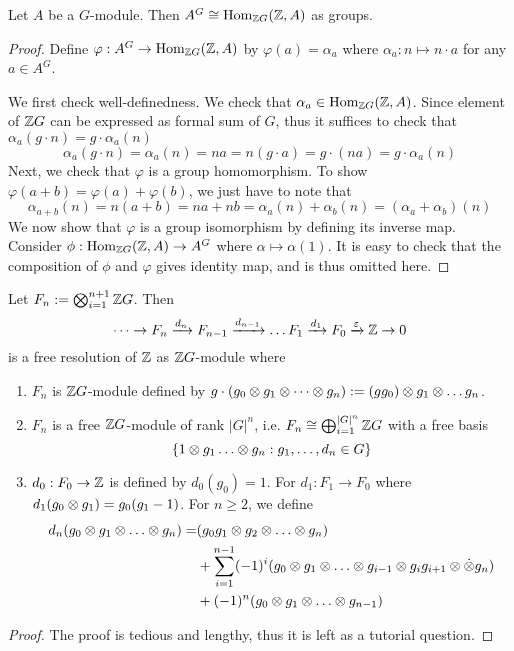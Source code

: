 \begin{lem}
    Let $A$ be a $G$-module. Then $A^G \cong \operatorname{Hom}_{{\mathbb Z} G}({\mathbb Z},A)$ as groups.
\end{lem}
\begin{proof}
    Define $\varphi: A^G \to \operatorname{Hom}_{{\mathbb Z} G}({\mathbb Z}, A)$ by $\varphi(a)= \alpha_a$ where $\alpha_a: n \mapsto n\cdot a$ for any $a\in A^G$.

    We first check well-definedness. We check that $\alpha_a \in \operatorname{Hom}_{{\mathbb Z} G}({\mathbb Z},A)$. Since element of ${\mathbb Z} G$ can be expressed as formal sum of $G$, thus it suffices to check that $\alpha_a(g\cdot n) = g\cdot \alpha_a(n)$ 
    \[\alpha_a(g\cdot n) = \alpha_a(n) = na = n(g \cdot a) = g\cdot (na) = g\cdot \alpha_a(n)\]
    Next, we check that $\varphi$ is a group homomorphism. To show $\varphi(a+b)= \varphi(a) + \varphi(b)$, we just have to note that 
    \[\alpha_{a+b}(n) = n(a+b) = na + nb = \alpha_a(n) + \alpha_b(n) = (\alpha_a + \alpha_b)(n)\]
    We now show that $\varphi$ is a group isomorphism by defining its inverse map. Consider $\phi:\operatorname{Hom}_{{\mathbb Z} G}({\mathbb Z}, A) \to A^G$ where $\alpha\mapsto \alpha(1)$. It is easy to check that the composition of $\phi$ and $\varphi$ gives identity map, and is thus omitted here.
\end{proof}

\begin{pro}
    Let $F_n := \bigotimes_{i=1}^{n+1} {\mathbb Z} G$. Then
    \[\dots \to F_n \xrightarrow{d_n} F_{n-1} \xrightarrow{d_{n-1}} \dots F_1 \xrightarrow{d_1} F_0 \xrightarrow{\varepsilon} {\mathbb Z} \to 0\]
    is a free resolution of ${\mathbb Z}$ as ${\mathbb Z} G$-module where
    \begin{enumerate}
        \item $F_n$ is ${\mathbb Z} G$-module defined by $g\cdot (g_0 \otimes g_1 \otimes \dots \otimes g_n) := (gg_0) \otimes g_1 \otimes \dots g_n$.
        \item $F_n$ is a free ${\mathbb Z} G$-module of rank $|G|^n$, i.e. $F_n \cong \bigoplus_{i=1}^{|G|^n} {\mathbb Z} G$ with a free basis
        \[\sbr{1\ten g_1 \dots \ten g_n:g_1, \dots, d_n\in G}\]
        \item $d_0:F_0 \to {\mathbb Z}$ is defined by $d_0(g_0)=1$. For $d_1:F_1\to F_0$ where $d_1(g_0\otimes g_1)= g_0(g_1-1)$. For $n\geq 2$, we define
        \begin{align*}
            d_n(g_0 \ten g_1 \ten \dots \ten g_n)=
            &(g_0g_1\ten g_2 \ten \dots \ten g_n)\\ 
            &+ \sum_{i=1}^{n-1}(-1)^i(g_0\ten g_1 \ten \dots \ten g_{i-1}\ten g_{i}g_{i+1} \ten \dot \ten g_n)\\ 
            &+ (-1)^n(g_0\ten g_1 \ten \dots \ten g_{n-1})
        \end{align*}
    \end{enumerate}
\end{pro}
\begin{proof}
    The proof is tedious and lengthy, thus it is left as a tutorial question.
\end{proof}

